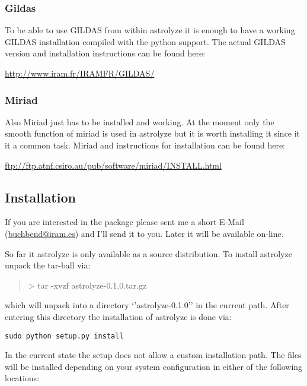 \documentclass[letterpaper,10pt,english]{sphinxhowto}
\begin{document}
\subsubsection{Gildas}
\label{installation:gildas}
To be able to use GILDAS from within astrolyze it is enough to have a working
GILDAS installation compiled with the python support. The actual GILDAS version
and installation instructions can be found here:

\href{http://www.iram.fr/IRAMFR/GILDAS/}{http://www.iram.fr/IRAMFR/GILDAS/}


\subsubsection{Miriad}
\label{installation:miriad}
Also Miriad just has to be installed and working. At the moment only the smooth
function of miriad is used in astrolyze but it is worth installing it since it
it a common task. Miriad and instructions for installation can be found here:

\href{ftp://ftp.atnf.csiro.au/pub/software/miriad/INSTALL.html}{ftp://ftp.atnf.csiro.au/pub/software/miriad/INSTALL.html}


\subsection{Installation}
\label{installation:installation}
If you are interested in the package please sent me a short E-Mail
(\href{mailto:buchbend@iram.es}{buchbend@iram.es}) and I'll send it to you. Later it will be available on-line.

So far it astrolyze is only available as a source distribution. To install
astrolyze unpack the tar-ball via:
\begin{quote}

\textgreater{} tar -xvzf astrolyze-0.1.0.tar.gz
\end{quote}

which will unpack into a directory `'astrolyze-0.1.0'' in the current path.
After entering this directory the installation of astrolyze is done via:

\begin{Verbatim}[commandchars=\\\{\}]
sudo python setup.py install
\end{Verbatim}

In the current state the setup does not allow a custom installation path. The
files will be installed depending on your system configuration in either of the
following locations:
\end{document}
